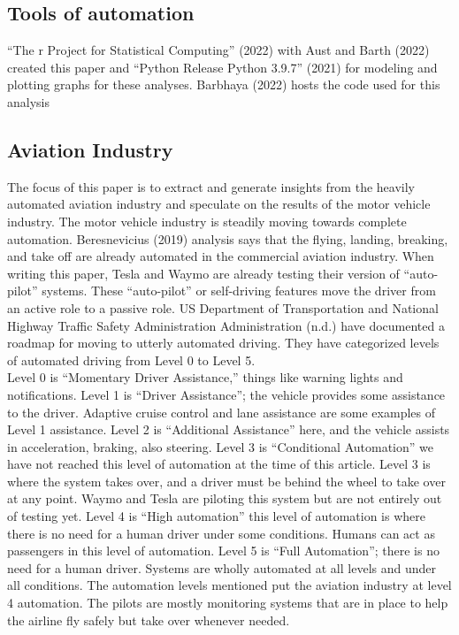 \documentclass[
  man,floatsintext]{apa7}
\begin{document}
\hypertarget{tools-of-automation}{%
\subsection{Tools of automation}\label{tools-of-automation}}

{``The r Project for Statistical Computing''} (2022) with Aust and Barth (2022) created this paper and {``Python Release Python 3.9.7''} (2021) for modeling and plotting graphs for these analyses. Barbhaya (2022) hosts the code used for this analysis\\

\hypertarget{aviation-industry}{%
\subsection{Aviation Industry}\label{aviation-industry}}

The focus of this paper is to extract and generate insights from the heavily automated aviation industry and speculate on the results of the motor vehicle industry. The motor vehicle industry is steadily moving towards complete automation. Beresnevicius (2019) analysis says that the flying, landing, breaking, and take off are already automated in the commercial aviation industry. When writing this paper, Tesla and Waymo are already testing their version of ``auto-pilot'' systems. These ``auto-pilot'' or self-driving features move the driver from an active role to a passive role. US Department of Transportation and National Highway Traffic Safety Administration Administration (n.d.) have documented a roadmap for moving to utterly automated driving. They have categorized levels of automated driving from Level 0 to Level 5.\\

Level 0 is ``Momentary Driver Assistance,'' things like warning lights and notifications. Level 1 is ``Driver Assistance''; the vehicle provides some assistance to the driver. Adaptive cruise control and lane assistance are some examples of Level 1 assistance. Level 2 is ``Additional Assistance'' here, and the vehicle assists in acceleration, braking, also steering. Level 3 is ``Conditional Automation'' we have not reached this level of automation at the time of this article. Level 3 is where the system takes over, and a driver must be behind the wheel to take over at any point. Waymo and Tesla are piloting this system but are not entirely out of testing yet. Level 4 is ``High automation'' this level of automation is where there is no need for a human driver under some conditions. Humans can act as passengers in this level of automation. Level 5 is ``Full Automation''; there is no need for a human driver. Systems are wholly automated at all levels and under all conditions. The automation levels mentioned put the aviation industry at level 4 automation. The pilots are mostly monitoring systems that are in place to help the airline fly safely but take over whenever needed.\\
\end{document}
